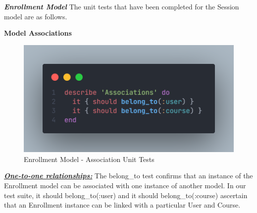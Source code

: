 \begin{justify}


\newendline \textbf{\textit{Enrollment Model}}\newendline
The unit tests that have been completed for the Session model are as follows.

\vspace{0.25cm}
\newendline
\textbf{Model Associations}

    \begin{figure}[H]
        \centerline{\includegraphics[width=140mm,scale=1]{figures/implementation_and_testing/testing/AUT/enrollment/associations.png}}
        \caption{Enrollment Model - Association Unit Tests}
        \label{Enrollment Model - Association Unit Tests}
    \end{figure}

\vspace{0.25cm}
\noindent\textbf{\textit{\underline{One-to-one relationships:}}} The belong\_to test confirms that an instance of the Enrollment model can be associated with one instance of another model. In our test suite, it { should belong\_to(:user) } and it { should belong\_to(:course) } ascertain that an Enrollment instance can be linked with a particular User and Course.


\end{justify}
